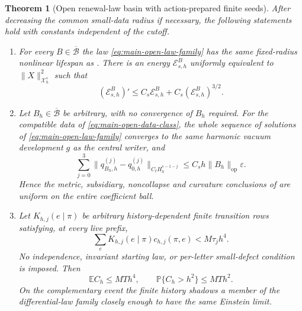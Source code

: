 \documentclass[11pt]{article}
\newtheorem{theorem}{Theorem}[section]
\theoremstyle{definition}
\theoremstyle{remark}
\newcommand{\op}{\mathrm{op}}
\begin{document}
\begin{theorem}[Open renewal-law basin with action-prepared finite seeds]
\label{thm:main-open-law-basin}
After decreasing the common small-data radius if necessary, the following
statements hold with constants independent of the cutoff.
\begin{enumerate}[label=\textup{(L\arabic*)},leftmargin=3em]
\item For every $B\in\overline{\mathcal B}$ the law
      \eqref{eq:main-open-law-family} has the same fixed-radius nonlinear
      lifespan as .  There is an energy
      $\mathscr E^B_{s,h}$ uniformly equivalent to
      $\|X\|_{\mathcal X_h^s}^2$ such that
      \begin{equation}
       (\mathscr E^B_{s,h})'
       \le C_s\mathscr E^B_{s,h}
          +C_s(\mathscr E^B_{s,h})^{3/2}.
       \label{eq:main-law-energy}
      \end{equation}
\item Let $B_h\in\overline{\mathcal B}$ be arbitrary, with no convergence of
      $B_h$ required.  For the compatible data of
      \eqref{eq:main-open-data-class}, the whole sequence of solutions of
      \eqref{eq:main-open-law-family} converges to the same harmonic vacuum
      development $g$ as the central writer, and
      \begin{equation}
       \sum_{j=0}^3
       \|q_{B_h,h}^{(j)}-q_{0,h}^{(j)}\|_{C_tH_h^{s-1-j}}
          \le C_sh\|B_h\|_{\op}\varepsilon.
       \label{eq:main-law-jet-comparison}
      \end{equation}
      Hence the metric, subsidiary, noncollapse and curvature conclusions of
       are uniform on the entire coefficient ball.
\item Let $K_{h,j}(e\mid\pi)$ be arbitrary history-dependent finite transition
      rows satisfying, at every live prefix,
      \begin{equation}
       \boxed{\sum_eK_{h,j}(e\mid\pi)c_{h,j}(\pi,e)<M\tau_jh^4.}
       \label{eq:main-law-row-moment}
      \end{equation}
      No independence, invariant starting law, or per-letter small-defect
      condition is imposed.  Then
      \begin{equation}
       \boxed{\mathbb EC_h\le MTh^4,
       \qquad \mathbb P\{C_h>h^2\}\le MTh^2.}
       \label{eq:main-law-probability}
      \end{equation}
      On the complementary event the finite history shadows a member of the
      differential-law family closely enough to have the same Einstein limit.

\end{enumerate}
\end{theorem}
\end{document}
